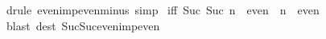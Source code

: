 \begin{isabellebody}
\ {\isacharparenleft}drule\ even{\isacharunderscore}imp{\isacharunderscore}even{\isacharunderscore}minus{\isacharunderscore}{}{\isacharcomma}\ simp{\isacharparenright}\isanewline
\isanewline
\isanewline
{}\ {\isacharbrackleft}iff{\isacharbrackright}{\isacharcolon}\ {\isachardoublequote}{\isacharparenleft}{\isacharparenleft}Suc\ {\isacharparenleft}Suc\ n{\isacharparenright}{\isacharparenright}\ {\isasymin}\ even{\isacharparenright}\ {\isacharequal}\ {\isacharparenleft}n\ {\isasymin}\ even{\isacharparenright}{\isachardoublequote}\isanewline
{}\ {\isacharparenleft}blast\ dest{\isacharcolon}\ Suc{\isacharunderscore}Suc{\isacharunderscore}even{\isacharunderscore}imp{\isacharunderscore}even{\isacharparenright}\isanewline
\isanewline
{}\isanewline
\isanewline
\end{isabellebody}%
